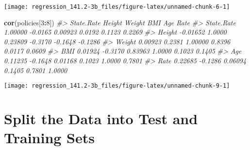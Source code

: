 \documentclass[]{book}
\newenvironment{Shaded}{\begin{snugshade}}{\end{snugshade}}
\newcommand{\CommentTok}[1]{\textcolor[rgb]{0.56,0.35,0.01}{\textit{#1}}}
\newcommand{\DataTypeTok}[1]{\textcolor[rgb]{0.13,0.29,0.53}{#1}}
\newcommand{\DecValTok}[1]{\textcolor[rgb]{0.00,0.00,0.81}{#1}}
\newcommand{\KeywordTok}[1]{\textcolor[rgb]{0.13,0.29,0.53}{\textbf{#1}}}
\newcommand{\NormalTok}[1]{#1}
\newcommand{\OperatorTok}[1]{\textcolor[rgb]{0.81,0.36,0.00}{\textbf{#1}}}
\begin{document}
\begin{center}\texttt{[image: regression\_141.2-3b\_files/figure-latex/unnamed-chunk-6-1]} \end{center}

\begin{Shaded}
\begin{Highlighting}[]
\KeywordTok{cor}\NormalTok{(policies[}\DecValTok{3}\OperatorTok{:}\DecValTok{8}\NormalTok{])}
\CommentTok{#>            State.Rate  Height  Weight     BMI     Age    Rate}
\CommentTok{#> State.Rate    1.00000 -0.0165 0.00923  0.0192  0.1123  0.2269}
\CommentTok{#> Height       -0.01652  1.0000 0.23809 -0.3170 -0.1648 -0.1286}
\CommentTok{#> Weight        0.00923  0.2381 1.00000  0.8396  0.0117  0.0609}
\CommentTok{#> BMI           0.01924 -0.3170 0.83963  1.0000  0.1023  0.1405}
\CommentTok{#> Age           0.11235 -0.1648 0.01168  0.1023  1.0000  0.7801}
\CommentTok{#> Rate          0.22685 -0.1286 0.06094  0.1405  0.7801  1.0000}
\end{Highlighting}
\end{Shaded}

\begin{Shaded}
\end{Shaded}

\begin{Shaded}
\end{Shaded}

\begin{center}\texttt{[image: regression\_141.2-3b\_files/figure-latex/unnamed-chunk-9-1]} \end{center}

\hypertarget{split-the-data-into-test-and-training-sets}{%
\section{Split the Data into Test and Training Sets}\label{split-the-data-into-test-and-training-sets}}
\end{document}
